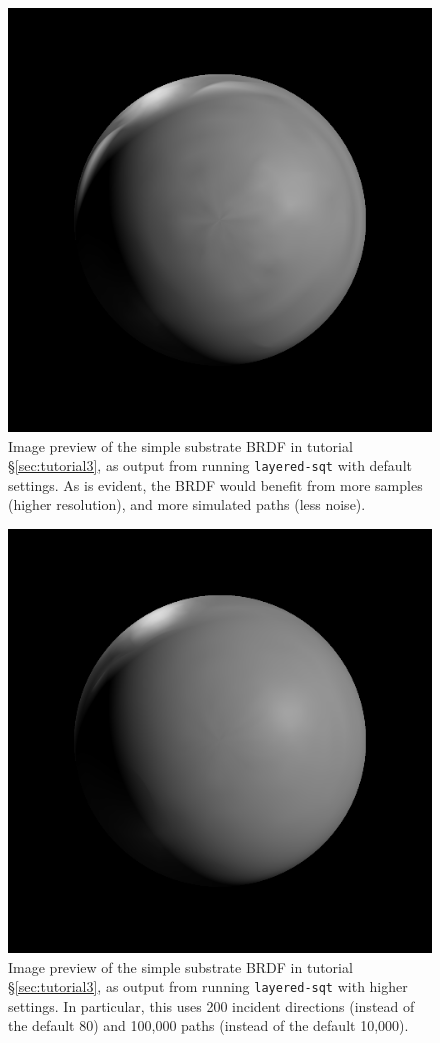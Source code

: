 \documentclass[
    twoside,
    twocolumn,
    letterpaper,
    10pt]{article}
\begin{document}
\begin{figure}
\begin{center}
    \includegraphics[width=0.75\columnwidth]{tutorial3-1.png}
    \caption{Image preview of the simple substrate BRDF in tutorial 
    \S\ref{sec:tutorial3}, as output from running \texttt{layered-sqt} with
    default settings. As is evident, the BRDF would benefit from more
    samples (higher resolution), and more simulated paths (less noise).
    \label{fig:tutorial3-1}}
\end{center}
\end{figure}

\begin{figure}
\begin{center}
    \includegraphics[width=0.75\columnwidth]{tutorial3-2.png}
    \caption{Image preview of the simple substrate BRDF in tutorial
    \S\ref{sec:tutorial3}, as output from running \texttt{layered-sqt} with
    higher settings. In particular, this uses 200 incident directions (instead
    of the default 80) and 100,000 paths (instead of the default 10,000).
    \label{fig:tutorial3-2}}
\end{center}
\end{figure}
\end{document}
